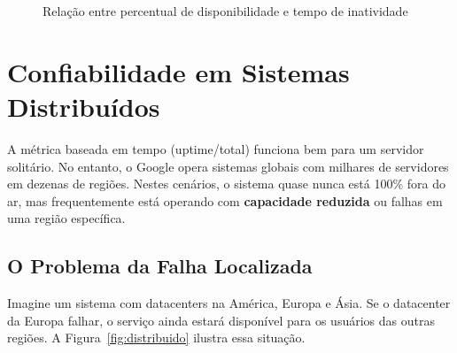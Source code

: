 \documentclass[12pt,a4paper,twoside]{report}
\begin{document}
\begin{figure}[h]
    \centering
    \caption{Relação entre percentual de disponibilidade e tempo de inatividade}
    \label{fig:log-noves}
\end{figure}

\section{Confiabilidade em Sistemas Distribuídos}

A métrica baseada em tempo (uptime/total) funciona bem para um servidor solitário. No entanto, o Google opera sistemas globais com milhares de servidores em dezenas de regiões. Nestes cenários, o sistema quase nunca está 100\% fora do ar, mas frequentemente está operando com \textbf{capacidade reduzida} ou falhas em uma região específica.

\subsection{O Problema da Falha Localizada}

Imagine um sistema com datacenters na América, Europa e Ásia. Se o datacenter da Europa falhar, o serviço ainda estará disponível para os usuários das outras regiões. A Figura~\ref{fig:distribuido} ilustra essa situação.
\end{document}
